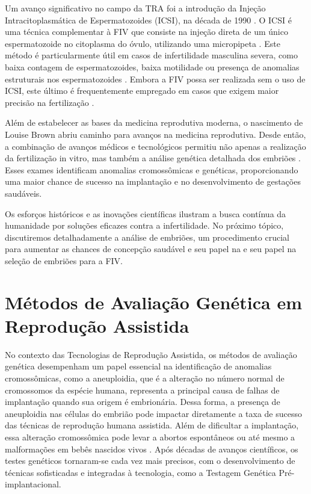 Um avanço significativo no campo da TRA foi a introdução da Injeção Intracitoplasmática de Espermatozoides (ICSI), na década de 1990 \cite{pereira2016}. O ICSI é uma técnica complementar à FIV que consiste na injeção direta de um único espermatozoide no citoplasma do óvulo, utilizando uma micropipeta \cite{pereira2016}. Este método é particularmente útil em casos de infertilidade masculina severa, como baixa contagem de espermatozoides, baixa motilidade ou presença de anomalias estruturais nos espermatozoides \cite{pereira2016}. Embora a FIV possa ser realizada sem o uso de ICSI, este último é frequentemente empregado em casos que exigem maior precisão na fertilização \cite{pereira2016}.

Além de estabelecer as bases da medicina reprodutiva moderna, o nascimento de Louise Brown abriu caminho para avanços na medicina reprodutiva. Desde então, a combinação de avanços médicos e tecnológicos permitiu não apenas a realização da fertilização in vitro, mas também a análise genética detalhada dos embriões \cite{moura2020}. Esses exames identificam anomalias cromossômicas e genéticas, proporcionando uma maior chance de sucesso na implantação e no desenvolvimento de gestações saudáveis.

Os esforços históricos e as inovações científicas ilustram a busca contínua da humanidade por soluções eficazes contra a infertilidade. No próximo tópico, discutiremos detalhadamente a análise de embriões, um procedimento crucial para aumentar as chances de concepção saudável e seu papel na e seu papel na seleção de embriões para a FIV.

\section{Métodos de Avaliação Genética em Reprodução Assistida}

No contexto das Tecnologias de Reprodução Assistida, os métodos de avaliação genética desempenham um papel essencial na identificação de anomalias cromossômicas, como a aneuploidia, que é a alteração no número normal de cromossomos da espécie humana, representa a principal causa de falhas de implantação quando sua origem é embrionária. Dessa forma, a presença de aneuploidia nas células do embrião pode impactar diretamente a taxa de sucesso das técnicas de reprodução humana assistida. Além de dificultar a implantação, essa alteração cromossômica pode levar a abortos espontâneos ou até mesmo a malformações em bebês nascidos vivos \cite{milanezi2022}. Após décadas de avanços científicos, os testes genéticos tornaram-se cada vez mais precisos, com o desenvolvimento de técnicas sofisticadas e integradas à tecnologia, como a Testagem Genética Pré-implantacional.

